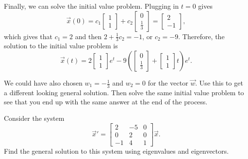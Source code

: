\documentclass{ximera}
\begin{document}
\begin{exampleSol}
    Finally, we can solve the initial value problem. Plugging in $t=0$ gives
    \begin{equation*}
        \vec{x}(0) = c_1 
        \begin{bmatrix} 
            1 \\ 
            1 
        \end{bmatrix} + c_2 
        \begin{bmatrix} 
            0 \\ 
            \frac{1}{3} 
        \end{bmatrix} = 
        \begin{bmatrix} 
            2 \\ 
            -1 
        \end{bmatrix},
    \end{equation*}
    which gives that $c_1 = 2$ and then $2 + \frac{1}{3}c_2 = -1$, or $c_2 = -9$. Therefore, the solution to the initial value problem is
    \begin{equation*}
        \vec{x}(t) = 2 
        \begin{bmatrix} 
            1 \\ 
            1 
        \end{bmatrix} 
        e^t - 9 \left(
        \begin{bmatrix} 
            0 \\ 
            \frac{1}{3}
        \end{bmatrix} + 
        \begin{bmatrix} 
            1 \\ 
            1 
        \end{bmatrix} 
        t \right) e^{t}.
    \end{equation*}
\end{exampleSol}

\begin{exercise}
    We could have also chosen $w_1 = -\frac{1}{3}$ and $w_2 = 0$ for the vector $\vec{w}$. Use this to get a different looking general solution. Then solve the same initial value problem to see that you end up with the same answer at the end of the process. 
\end{exercise}

\begin{example}
    Consider the system
    \begin{equation*}
        \vec{x}' =
        \begin{bmatrix}
            2 & -5 & 0 \\
            0 & 2 & 0 \\
            -1 & 4 & 1
        \end{bmatrix}
        \vec{x} .
    \end{equation*}
    Find the general solution to this system using eigenvalues and eigenvectors.
\end{example}
\end{document}
